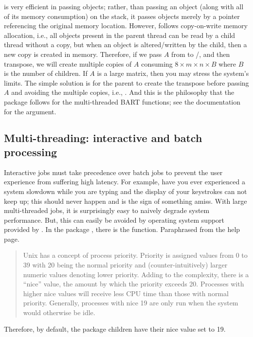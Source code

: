 \documentclass[article]{jss}
\begin{document}
 is very efficient in passing objects; rather, than
passing an object (along with all of its memory consumption) on the
stack, it passes objects merely by a pointer referencing the original
memory location.  However,  follows copy-on-write memory
allocation, i.e., all objects present in the parent thread can be read
by a child thread without a copy, but when an object is
altered/written by the child, then a new copy is created in memory.
Therefore, if we pass $A$ from  to
/, and then transpose, we will create
multiple copies of $A$ consuming $8 \times m \times n \times B$ where
$B$ is the number of children.  If $A$ is a large matrix, then you may
stress the system's limits.  The simple solution is for the parent to
create the transpose before passing $A$ and avoiding the multiple
copies, i.e., .  And this is the philosophy that the
 package follows for the multi-threaded BART functions; see
the documentation for the  argument.

\subsection{Multi-threading: interactive and batch processing}

Interactive jobs must take precedence over batch jobs to prevent the
user experience from suffering high latency.  For example, have you
ever experienced a system slowdown while you are typing and the
display of your keystrokes can not keep up; this should never happen
and is the sign of something amiss.  With large multi-threaded jobs,
it is surprisingly easy to naively degrade system performance.  But,
this can easily be avoided by operating system support provided by
.  In the  package \citep{RCor18}, there is
the  function.  Paraphrased from the  help
page.
\begin{quote}
  Unix has a concept of process priority.  Priority is assigned values from 0
  to 39 with 20 being the normal priority and (counter-intuitively)
  larger numeric values denoting lower priority.  Adding to the
  complexity, there is a ``nice'' value, the amount by which the
  priority exceeds 20.  Processes with higher nice values
  will receive less CPU time than those with normal priority.
  Generally, processes with nice 19 are only run when the system would
  otherwise be idle.
\end{quote}
Therefore, by default, the  package children have their nice
value set to 19.
\end{document}
